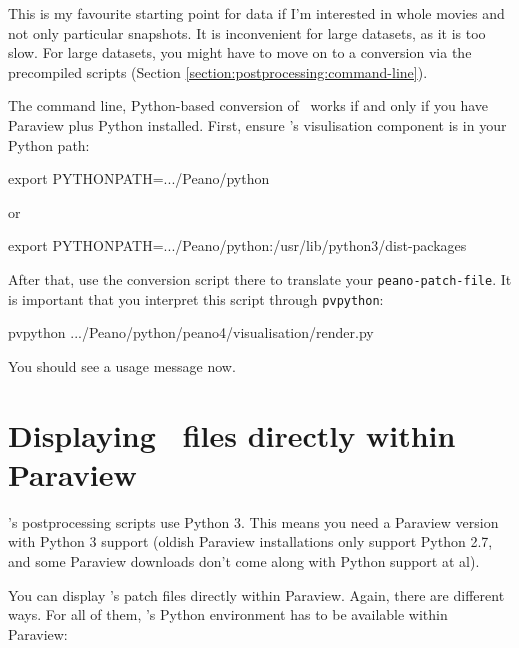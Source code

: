 \begin{remark}
 This is my favourite starting point for data if I'm interested in whole movies
 and not only particular snapshots. It is inconvenient for large datasets, as 
 it is too slow. For large datasets, you might have to move on to a conversion
 via the precompiled scripts (Section
 \ref{section:postprocessing:command-line}).
\end{remark}


\noindent
The command line, Python-based conversion of \Peano\ works if and only if you
have Paraview plus Python installed.
First, ensure \Peano's visulisation component is in your Python path:
\begin{code}
export PYTHONPATH=.../Peano/python  
\end{code}

\noindent
or

\begin{code}
export PYTHONPATH=.../Peano/python:/usr/lib/python3/dist-packages  
\end{code}


\noindent
After that, use the conversion script there to translate your
\texttt{peano-patch-file}. It is important that you interpret this script
through \texttt{pvpython}:

\begin{code}
pvpython .../Peano/python/peano4/visualisation/render.py 
\end{code}

\noindent
You should see a usage message now. 



\section{Displaying \Peano\ files directly within Paraview}
\label{label:postprocessing:display-in-paraview}

\begin{remark}
  \Peano's postprocessing scripts use Python 3. This means you need a Paraview
  version with Python 3 support (oldish Paraview installations only support
  Python 2.7, and some Paraview downloads don't come along with Python support
  at al).
\end{remark}


\noindent
You can display \Peano's patch files directly within Paraview. 
Again, there are different ways.
For all of them, \Peano's Python environment has to be available within Paraview:



